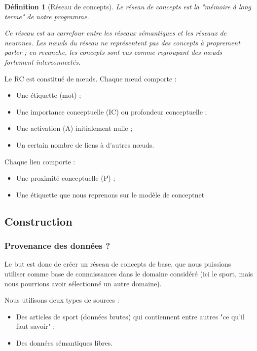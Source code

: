 \documentclass{article}           %
\newtheorem{definition}{D\'efinition}
\begin{document}
\begin{definition}[Réseau de concepts]
Le réseau de concepts est la "mémoire à long terme" de notre programme.

Ce réseau est au carrefour entre les réseaux sémantiques et les réseaux de neurones. Les n\oe uds du réseau ne représentent pas des concepts à proprement parler ; en revanche, les concepts sont vus comme regroupant des n\oe uds fortement interconnectés.
\end{definition}

Le RC est constitué de n\oe uds. Chaque n\oe ud comporte :
\begin{itemize}
  \item Une étiquette (mot) ;
 \item Une importance conceptuelle (IC) ou profondeur conceptuelle ;
 \item Une activation (A) initialement nulle ;
 \item Un certain nombre de liens à d'autres n\oe uds.
\end{itemize}

Chaque lien comporte :
\begin{itemize}
 \item Une proximité conceptuelle (P) ;
 \item Une étiquette que nous reprenons sur le modèle de conceptnet
\end{itemize}

\subsection{Construction}

\subsubsection{Provenance des données ?}

Le but est donc de créer un réseau de concepts de base, que nous puissions utiliser comme base de connaissances dans le domaine considéré (ici le sport, mais nous pourrions avoir sélectionné un autre domaine).

Nous utilisons deux types de sources :
\begin{itemize}
 \item Des articles de sport (données brutes) qui contiennent entre autres "ce qu'il faut savoir" ;
 \item Des données sémantiques libres.
\end{itemize}
\end{document}
